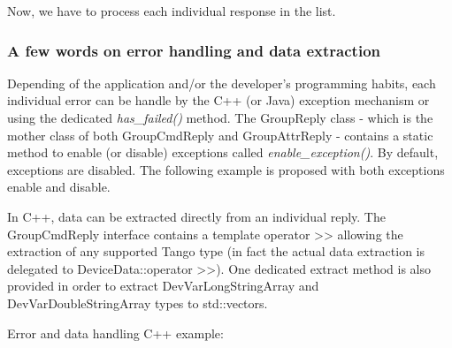 Now, we have to process each \textquotedbl{}individual response\textquotedbl{}
in the list. 

\subsubsection{A few words on error handling and data extraction}

Depending of the application and/or the developer's programming habits,
each individual error can be handle by the C++ (or Java) exception
mechanism or using the dedicated \emph{has\_failed()}
method. The GroupReply class - which is the mother
class of both GroupCmdReply and GroupAttrReply
- contains a static method to enable (or disable) exceptions called
\emph{enable\_exception()}. By default,
exceptions are disabled. The following example is proposed with both
exceptions enable and disable. 

In C++, data can be extracted directly from an individual reply. The
GroupCmdReply interface contains a template operator >\textcompwordmark{}>
allowing the extraction of any supported Tango type (in fact the actual
data extraction is delegated to DeviceData::operator >\textcompwordmark{}>).
One dedicated extract method is also provided in order to extract
DevVarLongStringArray and DevVarDoubleStringArray types to std::vectors.

Error and data handling C++ example:

